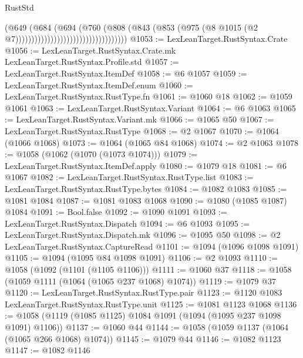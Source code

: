 \begin{lexlean}{RustStd}
\begin{coremodule}
{\begin{coremodule}
{{{{{{{{{{{{{{{{{{{{{{{{{{{{{{{{{{{{{{                                                      (@649
                                                        (@684
                                                          (@694
                                                            (@760
                                                              (@808
                                                                (@843
                                                                  (@853
                                                                    (@975
                                                                      (@8
                                                                        @1015
                                                                        (@2
                                                                          @7)))))))))))))))))))))))))))))))))))
@1053 := LexLeanTarget.RustSyntax.Crate
@1056 := LexLeanTarget.RustSyntax.Crate.mk LexLeanTarget.RustSyntax.Profile.std
@1057 := LexLeanTarget.RustSyntax.ItemDef
@1058 := @6 @1057
@1059 := LexLeanTarget.RustSyntax.ItemDef.enum
@1060 := LexLeanTarget.RustSyntax.RustType.fn
@1061 := @1060 @18
@1062 := @1059 @1061
@1063 := LexLeanTarget.RustSyntax.Variant
@1064 := @6 @1063
@1065 := LexLeanTarget.RustSyntax.Variant.mk
@1066 := @1065 @50
@1067 := LexLeanTarget.RustSyntax.RustType
@1068 := @2 @1067
@1070 := @1064 (@1066 @1068)
@1073 := @1064 (@1065 @84 @1068)
@1074 := @2 @1063
@1078 := @1058 (@1062 (@1070 (@1073 @1074)))
@1079 := LexLeanTarget.RustSyntax.ItemDef.apply
@1080 := @1079 @18
@1081 := @6 @1067
@1082 := LexLeanTarget.RustSyntax.RustType.list
@1083 := LexLeanTarget.RustSyntax.RustType.bytes
@1084 := @1082 @1083
@1085 := @1081 @1084
@1087 := @1081 @1083 @1068
@1090 := @1080 (@1085 @1087) @1084
@1091 := Bool.false
@1092 := @1090 @1091
@1093 := LexLeanTarget.RustSyntax.Dispatch
@1094 := @6 @1093
@1095 := LexLeanTarget.RustSyntax.Dispatch.mk
@1096 := @1095 @50
@1098 := @2 LexLeanTarget.RustSyntax.CaptureRead
@1101 := @1094 (@1096 @1098 @1091)
@1105 := @1094 (@1095 @84 @1098 @1091)
@1106 := @2 @1093
@1110 := @1058 (@1092 (@1101 (@1105 @1106)))
@1111 := @1060 @37
@1118 := @1058 (@1059 @1111 (@1064 (@1065 @237 @1068) @1074))
@1119 := @1079 @37
@1120 := LexLeanTarget.RustSyntax.RustType.pair
@1123 := @1120 @1083 LexLeanTarget.RustSyntax.RustType.unit
@1125 := @1081 @1123 @1068
@1136 := @1058 (@1119 (@1085 @1125) @1084 @1091 (@1094 (@1095 @237 @1098 @1091) @1106))
@1137 := @1060 @44
@1144 := @1058 (@1059 @1137 (@1064 (@1065 @266 @1068) @1074))
@1145 := @1079 @44
@1146 := @1082 @1123
@1147 := @1082 @1146
}}}}}}}}}}}}}}}}}}}}}}}}}}}}}}}}}}}}}}
\end{coremodule}}
\end{coremodule}
\end{lexlean}

